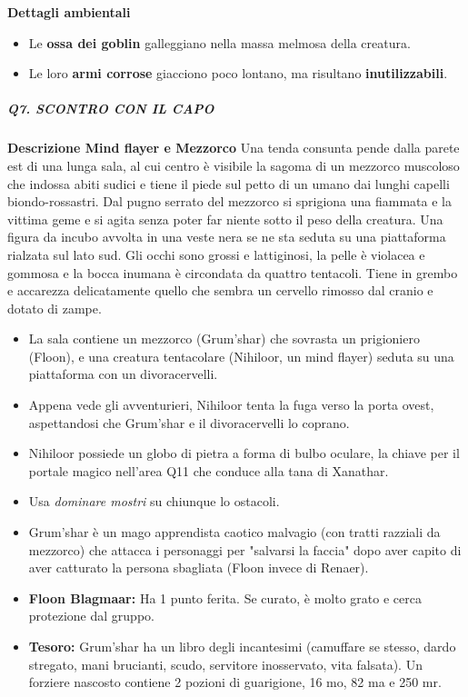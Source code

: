 \documentclass{article}
\begin{document}
\textbf{Dettagli ambientali}
\begin{itemize}
    \item Le \textbf{ossa dei goblin} galleggiano nella massa melmosa della creatura.
    \item Le loro \textbf{armi corrose} giacciono poco lontano, ma risultano \textbf{inutilizzabili}.
\end{itemize}
\subparagraph{Q7. SCONTRO CON IL CAPO}
\textbf{Descrizione Mind flayer e Mezzorco} 
Una tenda consunta pende dalla parete est di una lunga
sala, al cui centro è visibile la sagoma di un mezzorco
muscoloso che indossa abiti sudici e tiene il piede sul
petto di un umano dai lunghi capelli biondo-rossastri.
Dal pugno serrato del mezzorco si sprigiona una
fiammata e la vittima geme e si agita senza poter far
niente sotto il peso della creatura.
Una figura da incubo avvolta in una veste nera se ne sta
seduta su una piattaforma rialzata sul lato sud. Gli occhi
sono grossi e lattiginosi, la pelle è violacea e gommosa e
la bocca inumana è circondata da quattro tentacoli. Tiene
in grembo e accarezza delicatamente quello che sembra
un cervello rimosso dal cranio e dotato di zampe.
\begin{itemize}
    \item La sala contiene un mezzorco (Grum'shar) che sovrasta un prigioniero (Floon), e una creatura tentacolare (Nihiloor, un mind flayer) seduta su una piattaforma con un divoracervelli.
    \item Appena vede gli avventurieri, Nihiloor tenta la fuga verso la porta ovest, aspettandosi che Grum'shar e il divoracervelli lo coprano.
    \item Nihiloor possiede un globo di pietra a forma di bulbo oculare, la chiave per il portale magico nell'area Q11 che conduce alla tana di Xanathar.
    \item Usa \textit{dominare mostri} su chiunque lo ostacoli.
    \item Grum'shar è un mago apprendista caotico malvagio (con tratti razziali da mezzorco) che attacca i personaggi per "salvarsi la faccia" dopo aver capito di aver catturato la persona sbagliata (Floon invece di Renaer).
    \item \textbf{Floon Blagmaar:} Ha 1 punto ferita. Se curato, è molto grato e cerca protezione dal gruppo.
    \item \textbf{Tesoro:} Grum'shar ha un libro degli incantesimi (camuffare se stesso, dardo stregato, mani brucianti, scudo, servitore inosservato, vita falsata). Un forziere nascosto contiene 2 pozioni di guarigione, 16 mo, 82 ma e 250 mr.
\end{itemize}
\end{document}
